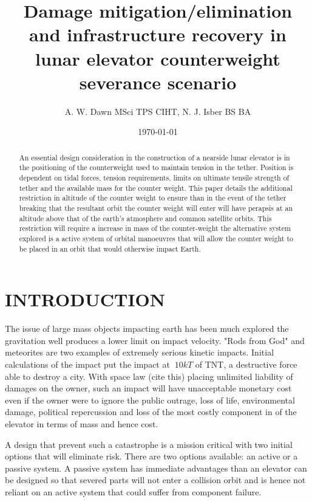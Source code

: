 \documentclass[twocolumn,prl,nobalancelastpage,aps,10pt]{revtex4-1}
\begin{document}
\title{Damage mitigation/elimination and infrastructure recovery in lunar elevator counterweight severance scenario}

\author{A. W. Dawn MSci TPS CIHT, N. J. Isber BS BA}


\begin{abstract} An essential design consideration in the construction of a nearside lunar elevator is in the positioning of the counterweight used to maintain tension in the tether. Position is dependent on tidal forces, tension requirements, limits on ultimate tensile strength of tether and the available mass for the counter weight. This paper details the additional restriction in altitude of the counter weight to ensure than in the event of the tether breaking that the resultant orbit the counter weight will enter will have perapsis at an altitude above that of the earth's atmosphere and common satellite orbits. This restriction will require a increase in mass of the counter-weight the alternative system explored is a active system of orbital manoeuvres that will allow the counter weight to be placed in an orbit that would otherwise impact Earth.

\end{abstract}
\date{\today}

\maketitle

\section{INTRODUCTION}

The issue of large mass objects impacting earth has been much explored the gravitation well produces a lower limit on impact velocity. "Rods from God" and meteorites are two examples of extremely serious kinetic impacts. Initial calculations of the impact put the impact at $~ 10 kT$ of TNT, a destructive force able to destroy a city. With space law (cite this) placing unlimited liability of damages on the owner, such an impact will have unacceptable monetary cost even if the owner were to ignore the public outrage, loss of life, environmental damage, political repercussion and loss of the most costly component in of the elevator in terms of mass and hence cost.

A design that prevent such a catastrophe is a mission critical with two initial options that will eliminate risk. There are two options available: an active or a passive system. A passive system has immediate advantages than an elevator can be designed so that severed parts will not enter a collision orbit and is hence not reliant on an active system that could suffer from component failure.
\end{document}

